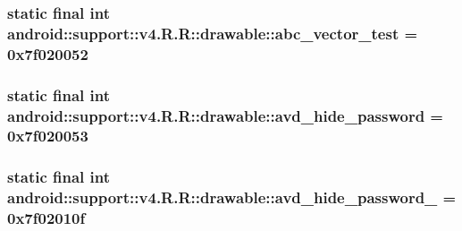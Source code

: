 \hypertarget{classandroid_1_1support_1_1v4_1_1_r_1_1drawable_d775d540da138c934c9fd4f3f2ebf13b}{
\subsubsection[{abc\_\-vector\_\-test}]{\setlength{\rightskip}{0pt plus 5cm}static final int android::support::v4.R.R::drawable::abc\_\-vector\_\-test = 0x7f020052}}
\label{classandroid_1_1support_1_1v4_1_1_r_1_1drawable_d775d540da138c934c9fd4f3f2ebf13b}


\hypertarget{classandroid_1_1support_1_1v4_1_1_r_1_1drawable_55ef914c192fe92dfa358d1032b03a29}{
\subsubsection[{avd\_\-hide\_\-password}]{\setlength{\rightskip}{0pt plus 5cm}static final int android::support::v4.R.R::drawable::avd\_\-hide\_\-password = 0x7f020053}}
\label{classandroid_1_1support_1_1v4_1_1_r_1_1drawable_55ef914c192fe92dfa358d1032b03a29}


\hypertarget{classandroid_1_1support_1_1v4_1_1_r_1_1drawable_9fb7ee6ddfe8051d5b49787322f02f19}{
\subsubsection[{avd\_\-hide\_\-password\_\-1}]{\setlength{\rightskip}{0pt plus 5cm}static final int android::support::v4.R.R::drawable::avd\_\-hide\_\-password\_ = 0x7f02010f}}
\label{classandroid_1_1support_1_1v4_1_1_r_1_1drawable_9fb7ee6ddfe8051d5b49787322f02f19}


